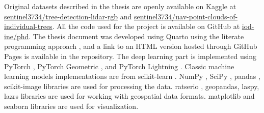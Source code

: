Original datasets described in the thesis are openly available on Kaggle at \href{https://www.kaggle.com/datasets/sentinel3734/tree-detection-lidar-rgb}{sentinel3734/tree-detection-lidar-rgb} and \href{https://www.kaggle.com/datasets/sentinel3734/uav-point-clouds-of-individual-trees}{sentinel3734/uav-point-clouds-of-individual-trees}.
All the code used for the project is available on GitHub at \href{https://github.com/iod-ine/phd}{iod-ine/phd}.
The thesis document was developed using Quarto \cite{Allaire_Quarto_2024} using the literate programming approach \cite{knuth84}, and a link to an HTML version hosted through GitHub Pages is available in the repository.
The deep learning part is implemented using PyTorch \cite{Ansel_PyTorch_2_Faster_2024}, PyTorch Geometric \cite{Fey_Fast_Graph_Representation_2019}, and PyTorch Lightning \cite{Falcon_PyTorch_Lightning_2019}.
Classic machine learning models implementations are from scikit-learn \cite{scikit-learn}.
NumPy \cite{2020NumPy-Array}, SciPy \cite{2020SciPy-NMeth}, pandas \cite{The_pandas_development_team_pandas-dev_pandas_Pandas}, scikit-image \cite{van_der_Walt_scikit-image_image_processing_2014} libraries are used for processing the data.
ratserio \cite{gillies_2019}, geopandas, laspy, lazrs libraries are used for working with geospatial data formats.
matplotlib \cite{Hunter_Matplotlib_A_2D_2007} and seaborn \cite{waskomSeabornStatisticalData2021} libraries are used for visualization.
